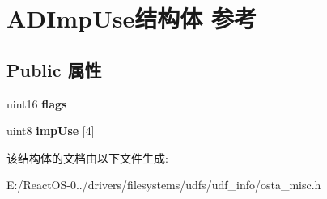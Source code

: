 \hypertarget{struct_a_d_imp_use}{}\section{A\+D\+Imp\+Use结构体 参考}
\label{struct_a_d_imp_use}
\subsection*{Public 属性}
\begin{DoxyCompactItemize}
\item 
\mbox{\label{struct_a_d_imp_use_a9bff0c884bfd73435471b03f8bcacc96}} 
uint16 {\bfseries flags}
\item 
\mbox{\label{struct_a_d_imp_use_a23ca0f09f69d3ba6f0aded74f0ad8f0a}} 
uint8 {\bfseries imp\+Use} \mbox{[}4\mbox{]}
\end{DoxyCompactItemize}


该结构体的文档由以下文件生成\+:\begin{DoxyCompactItemize}
\item 
E\+:/\+React\+O\+S-\/0../drivers/filesystems/udfs/udf\+\_\+info/osta\+\_\+misc.\+h\end{DoxyCompactItemize}
